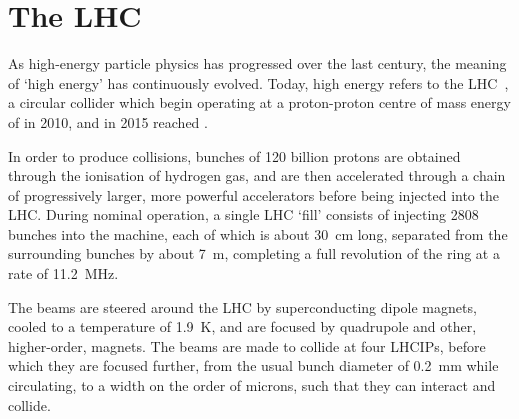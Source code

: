 \chapter{The \acl{LHC}}
\label{chap:intro:lhc}

As high-energy particle physics has progressed over the last century, the 
meaning of `high energy' has continuously evolved.
Today, high energy refers to the \acl{LHC}~\cite{Bruning:2004ej}, a circular 
collider which begin operating at a proton-proton centre of mass energy of 
 in 2010, and in 2015 reached .

In order to produce collisions, bunches of 120 billion protons are obtained 
through the ionisation of hydrogen gas, and are then accelerated through a 
chain of progressively larger, more powerful accelerators before being injected 
into the \ac{LHC}.
During nominal operation, a single \ac{LHC} `fill' consists of injecting 2808 
bunches into the machine, each of which is about \SI{30}{\centi\metre} long, 
separated from the surrounding bunches by about \SI{7}{\metre}, completing a 
full revolution of the ring at a rate of \SI{11.2}{\mega\hertz}.

The beams are steered around the \ac{LHC} by superconducting dipole magnets, 
cooled to a temperature of \SI{1.9}{\kelvin}, and are focused by quadrupole and 
other, higher-order, magnets.
The beams are made to collide at four \acp{LHCIP}, before which they are 
focused further, from the usual bunch diameter of \SI{0.2}{\milli\metre} while 
circulating, to a width on the order of microns, such that they can interact 
and collide.

